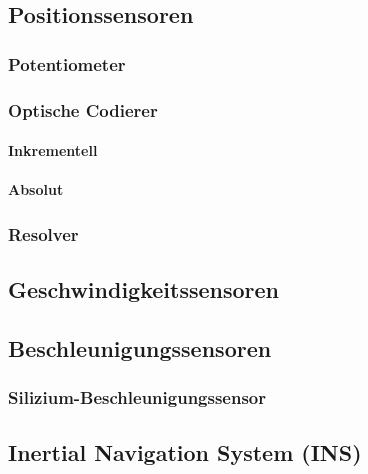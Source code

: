 \documentclass[a4paper, 11pt, accentcolor = tud3b]{tudreport}
\begin{document}
			\subsection{Positionssensoren} %

				\subsubsection{Potentiometer} %

				\subsubsection{Optische Codierer} %

					\paragraph{Inkrementell} %

					\paragraph{Absolut} %

				\subsubsection{Resolver} %

			\subsection{Geschwindigkeitssensoren} %

			\subsection{Beschleunigungssensoren} %

				\subsubsection{Silizium-Beschleunigungssensor} %

			\subsection{Inertial Navigation System (INS)} %
\end{document}
